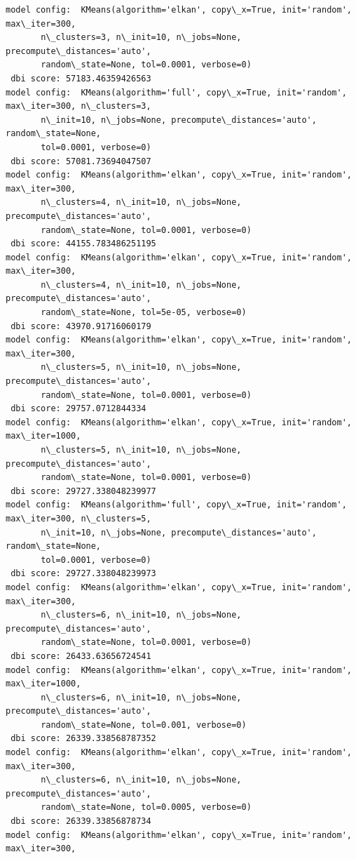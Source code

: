 \documentclass[11pt]{article}
\begin{document}
    \begin{Verbatim}[commandchars=\\\{\}]
model config:  KMeans(algorithm='elkan', copy\_x=True, init='random', max\_iter=300,
       n\_clusters=3, n\_init=10, n\_jobs=None, precompute\_distances='auto',
       random\_state=None, tol=0.0001, verbose=0) 
 dbi score: 57183.46359426563
model config:  KMeans(algorithm='full', copy\_x=True, init='random', max\_iter=300, n\_clusters=3,
       n\_init=10, n\_jobs=None, precompute\_distances='auto', random\_state=None,
       tol=0.0001, verbose=0) 
 dbi score: 57081.73694047507
model config:  KMeans(algorithm='elkan', copy\_x=True, init='random', max\_iter=300,
       n\_clusters=4, n\_init=10, n\_jobs=None, precompute\_distances='auto',
       random\_state=None, tol=0.0001, verbose=0) 
 dbi score: 44155.783486251195
model config:  KMeans(algorithm='elkan', copy\_x=True, init='random', max\_iter=300,
       n\_clusters=4, n\_init=10, n\_jobs=None, precompute\_distances='auto',
       random\_state=None, tol=5e-05, verbose=0) 
 dbi score: 43970.91716060179
model config:  KMeans(algorithm='elkan', copy\_x=True, init='random', max\_iter=300,
       n\_clusters=5, n\_init=10, n\_jobs=None, precompute\_distances='auto',
       random\_state=None, tol=0.0001, verbose=0) 
 dbi score: 29757.0712844334
model config:  KMeans(algorithm='elkan', copy\_x=True, init='random', max\_iter=1000,
       n\_clusters=5, n\_init=10, n\_jobs=None, precompute\_distances='auto',
       random\_state=None, tol=0.0001, verbose=0) 
 dbi score: 29727.338048239977
model config:  KMeans(algorithm='full', copy\_x=True, init='random', max\_iter=300, n\_clusters=5,
       n\_init=10, n\_jobs=None, precompute\_distances='auto', random\_state=None,
       tol=0.0001, verbose=0) 
 dbi score: 29727.338048239973
model config:  KMeans(algorithm='elkan', copy\_x=True, init='random', max\_iter=300,
       n\_clusters=6, n\_init=10, n\_jobs=None, precompute\_distances='auto',
       random\_state=None, tol=0.0001, verbose=0) 
 dbi score: 26433.63656724541
model config:  KMeans(algorithm='elkan', copy\_x=True, init='random', max\_iter=1000,
       n\_clusters=6, n\_init=10, n\_jobs=None, precompute\_distances='auto',
       random\_state=None, tol=0.001, verbose=0) 
 dbi score: 26339.338568787352
model config:  KMeans(algorithm='elkan', copy\_x=True, init='random', max\_iter=300,
       n\_clusters=6, n\_init=10, n\_jobs=None, precompute\_distances='auto',
       random\_state=None, tol=0.0005, verbose=0) 
 dbi score: 26339.33856878734
model config:  KMeans(algorithm='elkan', copy\_x=True, init='random', max\_iter=300,

\end{Verbatim}
\end{document}
